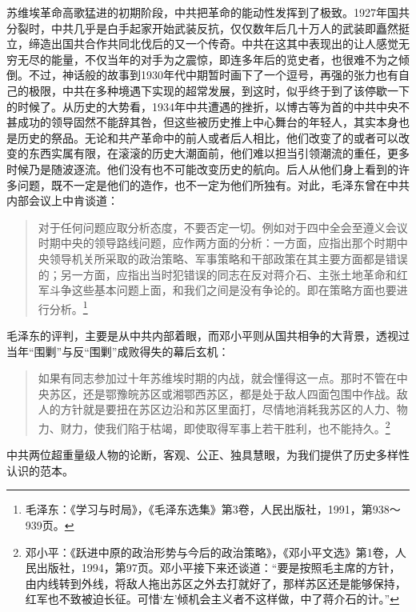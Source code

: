 苏维埃革命高歌猛进的初期阶段，中共把革命的能动性发挥到了极致。1927年国共分裂时，中共几乎是白手起家开始武装反抗，仅仅数年后几十万人的武装即矗然挺立，缔造出国共合作共同北伐后的又一个传奇。中共在这其中表现出的让人感觉无穷无尽的能量，不仅当年的对手为之震惊，即连多年后的览史者，也很难不为之倾倒。不过，神话般的故事到1930年代中期暂时画下了一个逗号，再强的张力也有自己的极限，中共在多种境遇下实现的超常发展，到这时，似乎终于到了该停歇一下的时候了。从历史的大势看，1934年中共遭遇的挫折，以博古等为首的中共中央不甚成功的领导固然不能辞其咎，但这些被历史推上中心舞台的年轻人，其实本身也是历史的祭品。无论和共产革命中的前人或者后人相比，他们改变了的或者可以改变的东西实属有限，在滚滚的历史大潮面前，他们难以担当引领潮流的重任，更多时候乃是随波逐流。他们没有也不可能改变历史的航向。后人从他们身上看到的许多问题，既不一定是他们的造作，也不一定为他们所独有。对此，毛泽东曾在中共内部会议上中肯谈道：

\begin{quote}
对于任何问题应取分析态度，不要否定一切。例如对于四中全会至遵义会议时期中央的领导路线问题，应作两方面的分析：一方面，应指出那个时期中央领导机关所采取的政治策略、军事策略和干部政策在其主要方面都是错误的；另一方面，应指出当时犯错误的同志在反对蒋介石、主张土地革命和红军斗争这些基本问题上面，和我们之间是没有争论的。即在策略方面也要进行分析。\footnote{毛泽东：《学习与时局》，《毛泽东选集》第3卷，人民出版社，1991，第938～939页。}
\end{quote}

毛泽东的评判，主要是从中共内部着眼，而邓小平则从国共相争的大背景，透视过当年“围剿”与反“围剿”成败得失的幕后玄机：

\begin{quote}
如果有同志参加过十年苏维埃时期的内战，就会懂得这一点。那时不管在中央苏区，还是鄂豫皖苏区或湘鄂西苏区，都是处于敌人四面包围中作战。敌人的方针就是要扭在苏区边沿和苏区里面打，尽情地消耗我苏区的人力、物力、财力，使我们陷于枯竭，即使取得军事上若干胜利，也不能持久。\footnote{邓小平：《跃进中原的政治形势与今后的政治策略》，《邓小平文选》第1卷，人民出版社，1994，第97页。邓小平接下来还谈道：“要是按照毛主席的方针，由内线转到外线，将敌人拖出苏区之外去打就好了，那样苏区还是能够保持，红军也不致被迫长征。可惜‘左’倾机会主义者不这样做，中了蒋介石的计。”}
\end{quote}

中共两位超重量级人物的论断，客观、公正、独具慧眼，为我们提供了历史多样性认识的范本。

